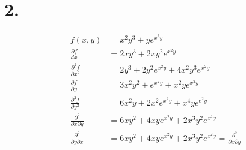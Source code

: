 \documentclass[a4paper]{scrartcl}
\begin{document}
\section{2.}
\begin{align}
f(x,y) &= x^2y^3+ye^{x^2 y} \\
\frac {\partial f} {dx} &= 2xy^3 + 2xy^2 e^{x^2 y} \\
\frac {\partial ^2f} {\partial x^2} &= 2y^3 + 2y^2e^{x^2 y} + 4x^2y^3e^{x^2 y} \\
\frac {\partial f} {\partial y} &= 3x^2y^2 + e^{x^2 y} + x^2 y e^{x^2 y} \\
\frac {\partial ^2f} {\partial y^2} &= 6x^2y + 2x^2e^{x^2 y} + x^4ye^{e^2 y} \\
\frac {\partial ^2} {\partial x\partial y} &= 6xy^2 + 4xye^{x^2 y} + 2x^3y^2e^{x^2 y} \\
\frac {\partial ^2} {\partial y\partial x} &= 6xy^2 + 4xye^{x^2 y} + 2x^3y^2e^{x^2 y} = \frac {\partial ^2} {\partial x\partial y}
\end{align}
\end{document}
